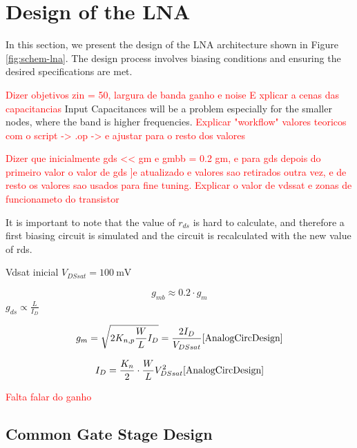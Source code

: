 \section{Design of the LNA}

In this section, we present the design of the LNA architecture shown in Figure \ref{fig:schem-lna}. The design process involves biasing conditions and ensuring the desired specifications are met.

\textcolor{red}{Dizer objetivos zin = 50, largura de banda ganho e noise E xplicar a cenas das capacitancias}
\label{sec:inpCap}
Input Capacitances will be a problem especially for the smaller nodes, where the band is higher frequencies. 
\textcolor{red}{Explicar "workflow" valores teoricos com o script -> .op -> e ajustar para o resto dos valores}

\textcolor{red}{Dizer que inicialmente gds << gm e gmbb = 0.2 gm, e para gds depois do primeiro valor o valor de gds ]e atualizado e valores sao retirados outra vez, e de resto os valores sao usados para fine tuning. Explicar o valor de vdssat e zonas de funcionameto do transistor}

It is important to note that the value of $r_{ds}$ is hard to calculate, and therefore a first biasing circuit is simulated and the circuit is recalculated with the new value of rds.

Vdsat inicial
$V_{DSsat} = \SI{100}{\milli\volt}$

\begin{equation}
    g_{mb}\approx 0.2\cdot g_m
    \label{eq:gmb_approx}
\end{equation}
$g_{ds}\propto \frac{L}{I_D}$\cite{AnalogCircDesign}

\begin{equation}
    g_m =\sqrt{2K_{n,p}\frac{W}{L}I_D}= \frac{2I_D}{V_{DSsat}}
    \text{\cite{AnalogCircDesign}}
    \label{eq:gm_eq}
\end{equation}

\begin{equation}
    I_D=\frac{K_n}{2}\cdot\frac{W}{L}V_{DSsat}^2
    \text{\cite{AnalogCircDesign}}
    \label{eq:ID_eq}
\end{equation}

\textcolor{red}{Falta falar do ganho}


\subsection{Common Gate Stage Design}


